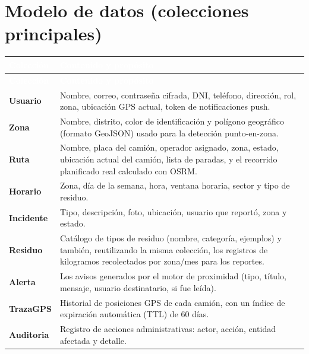 \documentclass[11pt,a4paper]{article}
\begin{document}
\section{Modelo de datos (colecciones principales)}

\begin{longtable}{|p{3cm}|p{11.5cm}|}
\hline
\rowcolor{azuloscuro}
\textcolor{white}{\textbf{Colección}} & \textcolor{white}{\textbf{Contenido y propósito}} \\
\hline
\endfirsthead
\hline
\rowcolor{azuloscuro}
\textcolor{white}{\textbf{Colección}} & \textcolor{white}{\textbf{Contenido y propósito}} \\
\hline
\endhead
\textbf{Usuario} & Nombre, correo, contraseña cifrada, DNI, teléfono, dirección, rol, zona, ubicación GPS actual, token de notificaciones push. \\
\hline
\textbf{Zona} & Nombre, distrito, color de identificación y polígono geográfico (formato GeoJSON) usado para la detección punto-en-zona. \\
\hline
\textbf{Ruta} & Nombre, placa del camión, operador asignado, zona, estado, ubicación actual del camión, lista de paradas, y el recorrido planificado real calculado con OSRM. \\
\hline
\textbf{Horario} & Zona, día de la semana, hora, ventana horaria, sector y tipo de residuo. \\
\hline
\textbf{Incidente} & Tipo, descripción, foto, ubicación, usuario que reportó, zona y estado. \\
\hline
\textbf{Residuo} & Catálogo de tipos de residuo (nombre, categoría, ejemplos) y también, reutilizando la misma colección, los registros de kilogramos recolectados por zona/mes para los reportes. \\
\hline
\textbf{Alerta} & Los avisos generados por el motor de proximidad (tipo, título, mensaje, usuario destinatario, si fue leída). \\
\hline
\textbf{TrazaGPS} & Historial de posiciones GPS de cada camión, con un índice de expiración automática (TTL) de 60 días. \\
\hline
\textbf{Auditoria} & Registro de acciones administrativas: actor, acción, entidad afectada y detalle. \\
\hline
\end{longtable}

\end{document}
